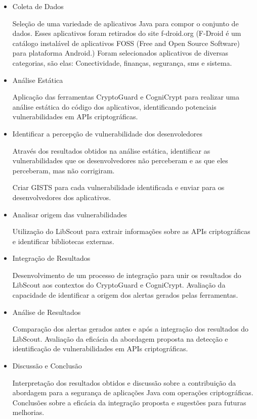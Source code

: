 \begin{itemize}
\item{Coleta de Dados}

Seleção de uma variedade de aplicativos Java para compor o conjunto de dados. Esses aplicativos foram retirados do site f-droid.org (F-Droid é um catálogo instalável de aplicativos FOSS (Free and Open Source Software) para plataforma Android.)
Foram selecionados aplicativos de diversas categorias, são elas: Conectividade, finanças, segurança, sms e sistema.

\item{Análise Estática}

Aplicação das ferramentas CryptoGuard e CogniCrypt para realizar uma análise estática do código dos aplicativos, identificando potenciais vulnerabilidades em APIs criptográficas.

\item{Identificar a percepção de vulnerabilidade dos desenvoledores}

Através dos resultados obtidos na análise estática, identificar as vulnerabilidades que os desenvolvedores não perceberam e as que eles perceberam, mas não corrigiram.

Criar GISTS para cada vulnerabilidade identificada e enviar para os desenvolvedores dos aplicativos.

\item{Analisar origem das vulnerabilidades}

Utilização do LibScout para extrair informações sobre as APIs criptográficas e identificar bibliotecas externas.

\item{Integração de Resultados}

Desenvolvimento de um processo de integração para unir os resultados do LibScout aos contextos do CryptoGuard e CogniCrypt.
Avaliação da capacidade de identificar a origem dos alertas gerados pelas ferramentas.

\item{Análise de Resultados}

Comparação dos alertas gerados antes e após a integração dos resultados do LibScout.
Avaliação da eficácia da abordagem proposta na detecção e identificação de vulnerabilidades em APIs criptográficas.

\item{Discussão e Conclusão}

Interpretação dos resultados obtidos e discussão sobre a contribuição da abordagem para a segurança de aplicações Java com operações criptográficas.
Conclusões sobre a eficácia da integração proposta e sugestões para futuras melhorias.
\end{itemize}

